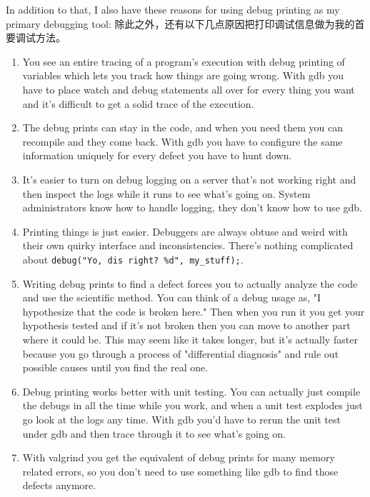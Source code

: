 In addition to that, I also have these reasons for using debug printing as my
primary debugging tool:
除此之外，还有以下几点原因把打印调试信息做为我的首要调试方法。
\begin{enumerate}
\item You see an entire tracing of a program's execution with debug printing of variables which lets you
    track how things are going wrong.  With gdb you have to place watch and debug statements all over
    for every thing you want and it's difficult to get a solid trace of the execution.
\item The debug prints can stay in the code, and when you need them you can recompile and they come back.
    With gdb you have to configure the same information uniquely for every defect you have to hunt down.
\item It's easier to turn on debug logging on a server that's not working right and then inspect the logs while
    it runs to see what's going on.  System administrators know how to handle logging, they don't know how
    to use gdb.
\item Printing things is just easier. Debuggers are always obtuse and weird with their own quirky interface and
    inconsistencies.  There's nothing complicated about \verb|debug("Yo, dis right? %d", my_stuff);|.
\item Writing debug prints to find a defect forces you to actually analyze the code and use the scientific method.
    You can think of a debug usage as, "I hypothesize that the code is broken here."  Then when you run it
    you get your hypothesis tested and if it's not broken then you can move to another part where it could be.
    This may seem like it takes longer, but it's actually faster because you go through a process of "differential
    diagnosis" and rule out possible causes until you find the real one.
\item Debug printing works better with unit testing.  You can actually just compile the debugs in all the time
    while you work, and when a unit test explodes just go look at the logs any time.  With gdb you'd have to
    rerun the unit test under gdb and then trace through it to see what's going on.
\item With valgrind you get the equivalent of debug prints for many memory related errors, so you don't need to
    use something like gdb to find those defects anymore.
\end{enumerate}

